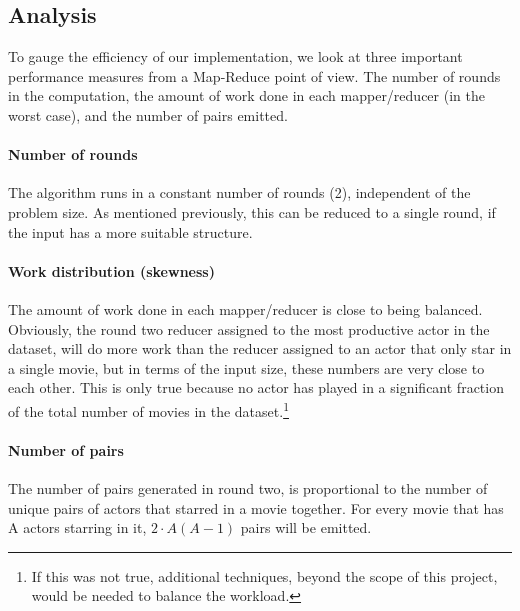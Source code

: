 \documentclass[a4paper,11pt]{article}
\begin{document}
\subsection{Analysis}
To gauge the efficiency of our implementation, we look at three important performance measures from a Map-Reduce point of view. The number of rounds in the computation, the amount of work done in each mapper/reducer (in the worst case), and the number of pairs emitted.

\paragraph{Number of rounds}
The algorithm runs in a constant number of rounds (2), independent of the problem size. As mentioned previously, this can be reduced to a single round, if the input has a more suitable structure.

\paragraph{Work distribution (skewness)}
The amount of work done in each mapper/reducer is close to being balanced. Obviously, the round two reducer assigned to the most productive actor in the dataset, will do more work than the reducer assigned to an actor that only star in a single movie, but in terms of the input size, these numbers are very close to each other. This is only true because no actor has played in a significant fraction of the total number of movies in the dataset.\footnote{If this was not true, additional techniques, beyond the scope of this project, would be needed to balance the workload.} 

\paragraph{Number of pairs}
The number of pairs generated in round two, is proportional to the number of unique pairs of actors that starred in a movie together. For every movie that has A actors starring in it, $2 \cdot A(A-1)$ pairs will be emitted. %
\end{document}

